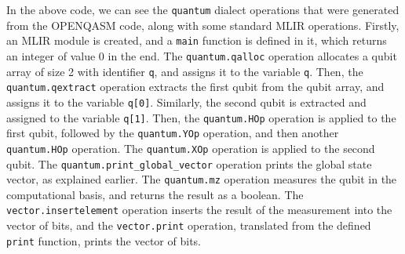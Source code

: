 In the above code, we can see the \texttt{quantum} dialect operations that were generated from the OPENQASM code, 
along with some standard MLIR operations. 
Firstly, an MLIR module is created, and a \texttt{main} function is defined in it, which returns an integer of value 0 in
the end.
The \texttt{quantum.qalloc} operation allocates a qubit array of size 2 with identifier \texttt{q}, and assigns it to the variable \texttt{q}.
Then, the \texttt{quantum.qextract} operation extracts the first qubit from the qubit array, and assigns it to the variable \texttt{q[0]}.
Similarly, the second qubit is extracted and assigned to the variable \texttt{q[1]}.
Then, the \texttt{quantum.HOp} operation is applied to the first qubit, followed by the \texttt{quantum.YOp} operation,
and then another \texttt{quantum.HOp} operation.
The \texttt{quantum.XOp} operation is applied to the second qubit.
The \texttt{quantum.print\_global\_vector} operation prints the global state vector, as explained earlier.
The \texttt{quantum.mz} operation measures the qubit in the computational basis, and returns the result as a boolean.
The \texttt{vector.insertelement} operation inserts the result of the measurement into the vector of bits, and the \texttt{vector.print} operation, 
translated from the defined \texttt{print} function, prints the vector of bits.


